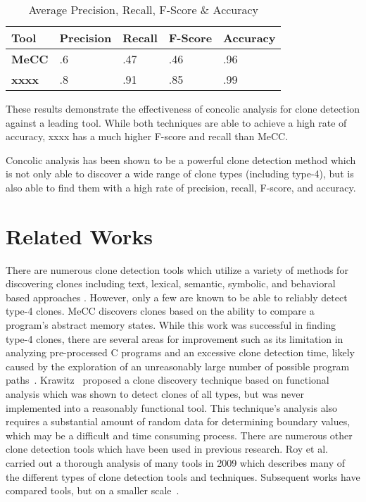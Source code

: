 \documentclass{sig-alternate}
\newif\ifisnopii
\begin{document}
\begin{table}[thb!]
\begin{center}
\caption{Average Precision, Recall, F-Score \& Accuracy}
\label{Table:precisionrecall}
\begin{tabular}{l|l|l|l|l}
\bfseries Tool & \bfseries Precision & \bfseries Recall & \bfseries F-Score & \bfseries Accuracy \\ \hline\hline
 \bfseries MeCC & .6 & .47 & .46 & .96 \\ \cline{2-5}
 \hline
 \bfseries \ifisnopii CCCD \else xxxx \fi & .8 & .91 & .85 & .99 \\
\end{tabular}

\end{center}

\end{table}


These results demonstrate the effectiveness of concolic analysis for clone detection against a leading tool. While both techniques are able to achieve a high rate of accuracy, \ifisnopii CCCD \else xxxx \fi has a much higher F-score and recall than MeCC.


Concolic analysis has been shown to be a powerful clone detection method which is not only able to discover a wide range of clone types (including type-4), but is also able to find them with a high rate of precision, recall, F-score, and accuracy.


\section{Related Works}
\label{sec: relatedworks}

There are numerous clone detection tools which utilize a variety of methods for discovering clones including text, lexical, semantic, symbolic, and behavioral based approaches \cite{Roy:2009:CEC:1530898.1531101,Kim:2011:MMC:1985793.1985835}. However, only a few are known to be able to reliably detect type-4 clones. MeCC discovers clones based on the ability to compare a program's abstract memory states. While this work was successful in finding type-4 clones, there are several areas for improvement such as its limitation in analyzing pre-processed C programs and an excessive clone detection time, likely caused by the exploration of an unreasonably large number of possible program paths~\cite{Kim:2011:MMC:1985793.1985835}. Krawitz~\cite{Kraw2012} proposed a clone discovery technique based on functional analysis which was shown to detect clones of all types, but was never implemented into a reasonably functional tool. This technique's analysis also requires a substantial amount of random data for determining boundary values, which may be a difficult and time consuming process. There are numerous other clone detection tools which have been used in previous research. Roy et al.~\cite{Roy:2009:CEC:1530898.1531101} carried out a thorough analysis of many tools in 2009 which describes many of the different types of clone detection tools and techniques. Subsequent works have compared tools, but on a smaller scale~\cite{arcelli2013software,svajlenko2013scaling}.
\end{document}
